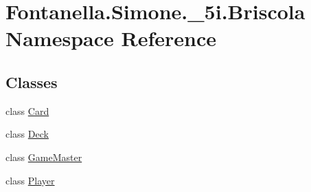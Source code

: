 \hypertarget{namespace_fontanella_1_1_simone_1_1__5i_1_1_briscola}{}\section{Fontanella.\+Simone.\+\_\+5i.\+Briscola Namespace Reference}
\label{namespace_fontanella_1_1_simone_1_1__5i_1_1_briscola}
\subsection*{Classes}
\begin{DoxyCompactItemize}
\item 
class \hyperlink{class_fontanella_1_1_simone_1_1__5i_1_1_briscola_1_1_card}{Card}
\item 
class \hyperlink{class_fontanella_1_1_simone_1_1__5i_1_1_briscola_1_1_deck}{Deck}
\item 
class \hyperlink{class_fontanella_1_1_simone_1_1__5i_1_1_briscola_1_1_game_master}{Game\+Master}
\item 
class \hyperlink{class_fontanella_1_1_simone_1_1__5i_1_1_briscola_1_1_player}{Player}
\end{DoxyCompactItemize}
